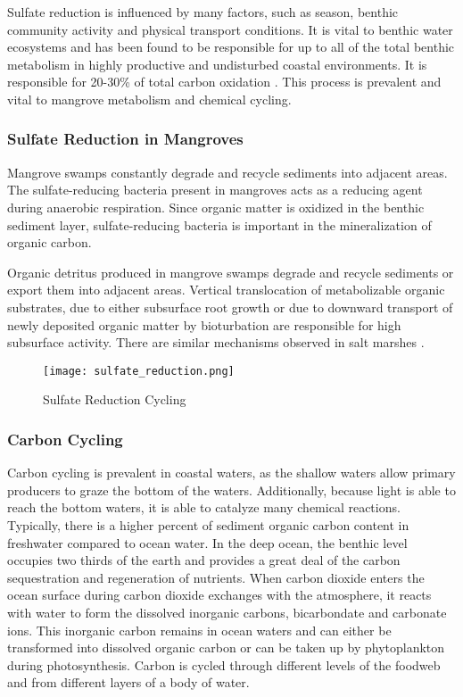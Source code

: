 Sulfate reduction is influenced by many factors, such as season, benthic community activity and physical transport conditions. It is vital to benthic water ecosystems and has been found to be responsible for up to all of the total benthic metabolism in highly productive and undisturbed coastal environments. It is responsible for 20-30\% of total carbon oxidation \citep{kristensen2000carbon}. This process is prevalent and vital to mangrove metabolism and chemical cycling. 




\subsubsection{Sulfate Reduction in Mangroves}
Mangrove swamps constantly degrade and recycle sediments into adjacent areas. The sulfate-reducing bacteria present in mangroves acts as a reducing agent during anaerobic respiration. Since organic matter is oxidized in the benthic sediment layer, sulfate-reducing bacteria is important in the mineralization of organic carbon. 


Organic detritus produced in mangrove swamps degrade and recycle sediments or export them into adjacent areas. Vertical translocation of metabolizable organic substrates, due to either subsurface root growth or due to downward transport of newly deposited organic matter by bioturbation are responsible for high subsurface activity. There are similar mechanisms observed in salt marshes \citep{kristensen1991benthic}.

\begin{figure}[!ht]
        \centering
        \texttt{[image: sulfate\_reduction.png]}
        \caption{Sulfate Reduction Cycling}
        \label{fig:Sulfate Reduction}
\end{figure}



\subsubsection{Carbon Cycling}
Carbon cycling is prevalent in coastal waters, as the shallow waters allow primary producers to graze the bottom of the waters. Additionally, because light is able to reach the bottom waters, it is able to catalyze many chemical reactions. Typically, there is a higher percent of sediment organic carbon content in freshwater compared to ocean water. In the deep ocean, the benthic level occupies two thirds of the earth and provides a great deal of the carbon sequestration and regeneration of nutrients. When carbon dioxide enters the ocean surface during carbon dioxide exchanges with the atmosphere, it reacts with water to form the dissolved inorganic carbons, bicarbondate and carbonate ions. This inorganic carbon remains in ocean waters and can either be transformed into dissolved organic carbon or can be taken up by phytoplankton during photosynthesis. Carbon is cycled through different levels of the foodweb and from different layers of a body of water.  


